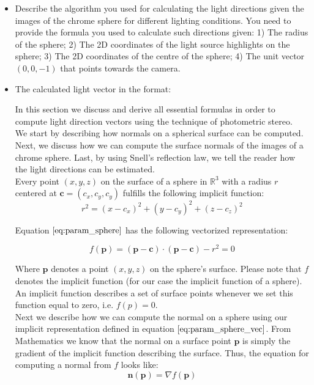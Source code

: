 \documentclass{paper}
\begin{document}
\begin{itemize}
\item Describe the algorithm you used for calculating the light directions given the images of the chrome sphere for different lighting conditions. You need to provide the formula you used to calculate such directions given: 1) The radius of the sphere; 2) The 2D coordinates of the light source highlights on the sphere; 3) The 2D coordinates of the centre of the sphere; 4) The unit vector $(0,0,-1)$ that points towards the camera.
\item The calculated light vector in the format:

In this section we discuss and derive all essential formulas in order to compute light direction vectors using the technique of photometric stereo. \\

We start by describing how normals on a spherical surface can be computed. Next, we discuss how we can compute the surface normals of the images of a chrome sphere. Last, by using Snell's reflection law, we tell the reader how the light directions can be estimated. \\

Every point $(x,y,z)$ on the surface of a sphere in $\mathbb{R}^3$ with a radius $r$ centered at $\textbf{c} = (c_x, c_y, c_y)$ fulfills the following implicit function:
\begin{equation}
    r^2 = (x-c_{x})^2 + (y-c_{y})^2 + (z-c_{z})^2
\label{eq:param_sphere}
\end{equation}

Equation $\ref{eq:param_sphere}$ has the following vectorized representation:

\begin{equation}
    f(\textbf{p}) = (\textbf{p}-\textbf{c}) \cdot (\textbf{p}-\textbf{c}) -r^2 = 0
\label{eq:param_sphere_vec}
\end{equation}

Where $\textbf{p}$ denotes a point $(x,y,z)$ on the sphere's surface. Please note that $f$ denotes the implicit function (for our case the implicit function of a sphere). An implicit function describes a set of surface points whenever we set this function equal to zero, i.e. $f(p) = 0$. \\

Next we describe how we can compute the normal on a sphere using our implicit representation defined in equation $\ref{eq:param_sphere_vec}$. From Mathematics we know that the normal on a surface point $\textbf{p}$ is simply the gradient of the implicit function describing the surface. Thus, the equation for computing a normal from $f$ looks like:
\begin{equation}
     	\textbf{n}(\textbf{p}) = \nabla f(\textbf{p})
\label{eq:normal_impfunc}
\end{equation}


\end{itemize}
\end{document}
